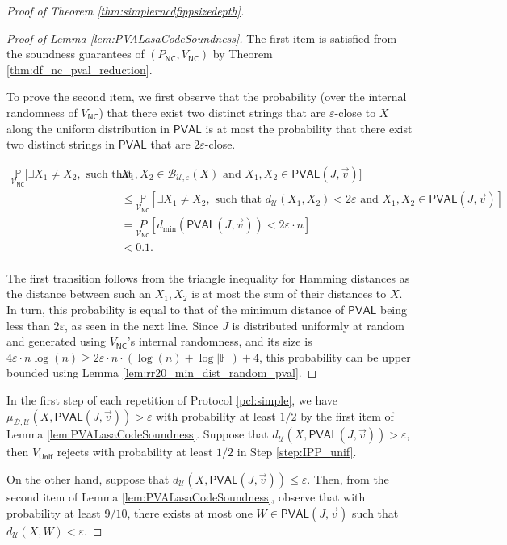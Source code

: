 \documentclass[10pt,a4paper]{article}
\newcommand{\NC}{\mathsf{NC}}
\newcommand{\PVAL}{\mathsf{PVAL}}
\newcommand{\F}{\mathbb{F}}
\newcommand{\sU}{\mathcal{U}}
\newcommand{\sD}{\mathcal{D}}
\newcommand{\sB}{\mathcal{B}}
\begin{document}
\begin{proof}[Proof of Theorem \ref{thm:simplerncdfippsizedepth}]
\begin{proof}[Proof of Lemma \ref{lem:PVALasaCodeSoundness}]
    The first item is satisfied from the soundness guarantees of $(P_\NC,V_\NC)$ by Theorem \ref{thm:df_nc_pval_reduction}. 
    
    To prove the second item, we first observe that the probability (over the internal randomness of $V_\NC$) that there exist two distinct strings that are $\varepsilon$-close to $X$ along the uniform distribution in $\PVAL$ is at most the probability that there exist two distinct strings in $\PVAL$ that are $2\varepsilon$-close.

    \[
    \begin{split}
        \underset{\mathcal{V}_{\NC}}{\mathbb{P}}[\exists X_1 \neq X_2, \text{ such that } &X_1, X_2 \in \sB_{\sU,\varepsilon}(X) \text{ and } X_{1},X_{2} \in \PVAL(J,\vec{v})]\\ 
        &\leq \underset{\mathcal{V}_{\NC}}{\mathbb{P}}[\exists X_1 \neq X_2, \text{ such that } d_{\mathcal{U}}(X_1, X_2)<2\varepsilon \text{ and } X_{1},X_{2} \in \PVAL(J,\vec{v})]\\
        &=\underset{\mathcal{V}_{\NC}}{P}[d_{\min}(\PVAL(J,\vec{v}))<2\varepsilon \cdot n] \\ 
        &< 0.1. \\
    \end{split}
    \]

    The first transition follows from the triangle inequality for Hamming distances as the distance between such an $X_{1},X_{2}$ is at most the sum of their distances to $X$. In turn, this probability is equal to that of the minimum distance of $\PVAL$ being less than $2\varepsilon$, as seen in the next line. Since $J$ is distributed uniformly at random and generated using $V_\NC$'s internal randomness, and its size is $4\varepsilon\cdot n \log (n)\geq 2\varepsilon\cdot n\cdot (\log (n) +\log |\F|)+4$, this probability can be upper bounded using Lemma \ref{lem:rr20_min_dist_random_pval}.
\end{proof}
    
    In the first step of each repetition of Protocol \ref{pcl:simple}, we have $\mu_{\sD,\sU}(X,\PVAL(J,\vec{v}))>\varepsilon$ with probability at least $1/2$ by the first item of Lemma \ref{lem:PVALasaCodeSoundness}. Suppose that $d_{\sU}(X,\PVAL(J,\vec{v}))>\varepsilon$, then $V_{\mathsf{Unif}}$ rejects with probability at least $1/2$ in Step \ref{step:IPP_unif}. 
    
    On the other hand, suppose that $d_{\sU}(X,\PVAL(J,\vec{v}))\leq\varepsilon$. Then, from the second item of Lemma \ref{lem:PVALasaCodeSoundness}, observe that with probability at least $9/10$, there exists at most one $W\in \PVAL(J,\vec{v})$ such that $d_{\sU}(X,W)<\varepsilon$. 
    

\end{proof}
\end{document}
